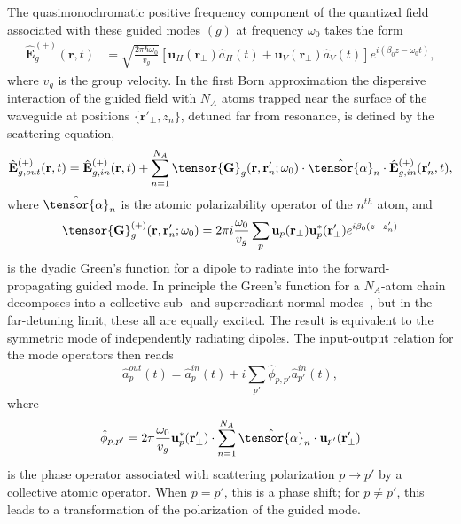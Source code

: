\documentclass[preprint,aps,pra,onecolumn,superscriptaddress]{revtex4-1} %
\def\br{\mathbf{r}}
\newcommand{\mbf}[1]{\mathbf{#1}}
\begin{document}
The quasimonochromatic positive frequency component of the quantized field associated with these guided modes $(g)$ at frequency $\omega_0$ takes the form
\begin{align}\label{eq:Ebp}
\hat{\mathbf{E}}^{(+)}_g(\mbf{r}, t) &= \sqrt{ \frac{2 \pi \hbar \omega_0}{ v_g} } \left[\mathbf{u}_H(\mbf{r}\!_\perp)  \hat{a}_H(t) + \mathbf{u}_V(\mbf{r}\!_\perp) \hat{a}_V(t)\right]  e^{i (\beta_0 z- \omega_0 t)},
\end{align}
where $v_g$ is the group velocity.  In the first Born approximation the dispersive interaction of the guided field with $N_A$ atoms trapped near the surface of the waveguide at positions $\{\mbf{r}'_\perp, z_n\}$, detuned far from resonance,  is defined by the scattering equation,
\begin{equation}
\hat{\mathbf{E}}^{(+)}_{g,out}(\mbf{r}, t)=\hat{\mathbf{E}}^{(+)}_{g,in}(\mbf{r}, t)+\sum_{n=1}^{N_A} \tensor{\mbf{G}}_{g} (\mbf{r}, \mbf{r}'_n;\omega_0) \cdot \hat{\tensor{\alpha}}_n \cdot \hat{\mathbf{E}}^{(+)}_{g,in}(\mbf{r}'_n, t),
\end{equation}
where $\hat{\tensor{\alpha}}_n$ is the atomic polarizability operator of the $n^{th}$ atom, and 
\begin{equation}
		\tensor{\mathbf{G}}^{(+)}_g(\br,\br'_n; \omega_0) =  2\pi i \frac{\omega_0}{v_g } \sum_{p} \mathbf{u}_{p} (\br_\perp)\mathbf{u}^*_{p} 
(\br_{\perp}^\prime) e^{i \beta_0(z-z'_n)}  \label{Eq::GreensGuided}
\end{equation}
is the dyadic Green's function for a dipole to radiate into the forward-propagating guided mode.  In principle the Green's function for a $N_A$-atom chain decomposes into a collective sub- and superradiant normal modes~\cite{Asenjo-Garcia2017Atom,Asenjo-Garcia2017Exponential}, but in the far-detuning limit, these all are equally excited.  The result is equivalent to the symmetric mode of independently radiating dipoles.  The input-output relation for the mode operators then reads
\begin{equation}
\hat{a}^{out}_p(t) = \hat{a}^{in}_p(t)  +i \sum_{p'} \hat{\phi}_{p,p'} \hat{a}^{in}_{p'}(t) ,
\end{equation}
where 
\begin{equation}
\hat{\phi}_{p,p'} = 2\pi \frac{\omega_0}{v_g} \mbf{u}^*_p (\mbf{r}'_\perp) \cdot \sum_{n=1}^{N_A} \hat{\tensor{\alpha}}_n \cdot \mbf{u}_{p'} (\mbf{r}'_\perp)
\end{equation}
is the phase operator associated with scattering polarization $p \rightarrow p'$ by a collective atomic operator.  When $p=p'$, this is a phase shift; for $p \neq p'$, this leads to a transformation of the polarization of the guided mode.
\end{document}
